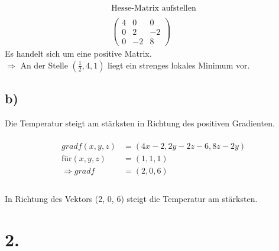 \documentclass[a4paper]{scrartcl}
\begin{document}
\begin{align}
\text{Hesse-Matrix aufstellen} \\
\\
\begin{pmatrix}
4 & 0 & 0 \\
0 & 2 & -2 \\
0 & -2 & 8 
\end{pmatrix}
\end{align}
Es handelt sich um eine positive Matrix. \\
\(\Rightarrow\) An der Stelle \((\frac{1}{2}, 4, 1)\) liegt ein strenges lokales Minimum vor.
\subsection{b)}
Die Temperatur steigt am stärksten in Richtung des positiven Gradienten. \\
\\
\begin{align}
gradf(x,y,z) &= (4x - 2, 2y - 2z - 6, 8z - 2y) \\
\text{für} (x,y,z) &= (1,1,1) \\
\Rightarrow gradf &= (2,0,6) \\
\end{align}
\\
In Richtung des Vektors (2, 0, 6) steigt die Temperatur am stärksten.
\newpage %
\section{2.}
\end{document}
